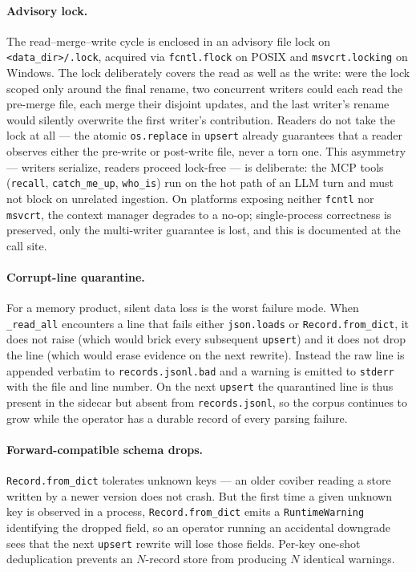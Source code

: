\paragraph{Advisory lock.}
The read–merge–write cycle is enclosed in an advisory file lock on
\texttt{<data\_dir>/.lock}, acquired via \texttt{fcntl.flock} on POSIX
and \texttt{msvcrt.locking} on Windows. The lock deliberately covers
the read as well as the write: were the lock scoped only around the
final rename, two concurrent writers could each read the pre-merge
file, each merge their disjoint updates, and the last writer's rename
would silently overwrite the first writer's contribution. Readers do
not take the lock at all — the atomic \texttt{os.replace} in
\texttt{upsert} already guarantees that a reader observes either the
pre-write or post-write file, never a torn one. This asymmetry —
writers serialize, readers proceed lock-free — is deliberate: the MCP
tools (\texttt{recall}, \texttt{catch\_me\_up}, \texttt{who\_is}) run
on the hot path of an LLM turn and must not block on unrelated
ingestion. On platforms exposing neither \texttt{fcntl} nor
\texttt{msvcrt}, the context manager degrades to a no-op; single-process
correctness is preserved, only the multi-writer guarantee is lost, and
this is documented at the call site.

\paragraph{Corrupt-line quarantine.}
For a memory product, silent data loss is the worst failure mode. When
\texttt{\_read\_all} encounters a line that fails either
\texttt{json.loads} or \texttt{Record.from\_dict}, it does not raise
(which would brick every subsequent \texttt{upsert}) and it does not
drop the line (which would erase evidence on the next rewrite).
Instead the raw line is appended verbatim to
\texttt{records.jsonl.bad} and a warning is emitted to \texttt{stderr}
with the file and line number. On the next \texttt{upsert} the
quarantined line is thus present in the sidecar but absent from
\texttt{records.jsonl}, so the corpus continues to grow while the
operator has a durable record of every parsing failure.

\paragraph{Forward-compatible schema drops.}
\texttt{Record.from\_dict} tolerates unknown keys — an older coviber
reading a store written by a newer version does not crash. But the
first time a given unknown key is observed in a process,
\texttt{Record.from\_dict} emits a \texttt{RuntimeWarning} identifying
the dropped field, so an operator running an accidental downgrade sees
that the next \texttt{upsert} rewrite will lose those fields. Per-key
one-shot deduplication prevents an $N$-record store from producing $N$
identical warnings.

